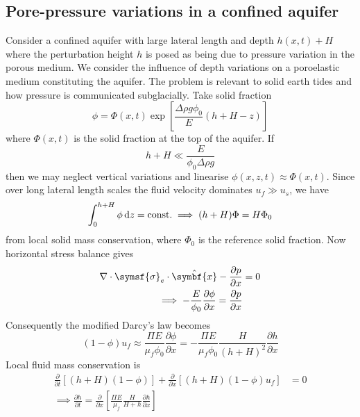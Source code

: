 \documentclass{jknotes}
\begin{document}
\subsection{Pore-pressure variations in a confined aquifer}
Consider a confined aquifer with large lateral length and depth $h(x,t) + H$
where the perturbation height $h$ is posed as being due to pressure variation
in the porous medium.  We consider the influence of depth variations on a
poroelastic medium constituting the aquifer. The problem is relevant to solid
earth tides and how pressure is communicated subglacially. Take solid fraction
\begin{equation}
	\phi = \Phi(x,t) \exp \left[ \frac{\Delta \rho g \phi_0}{E} (h+H-z)\right]
\end{equation}
where $\Phi(x,t)$ is the solid fraction at the top of the aquifer. If
\begin{equation}
	h + H \ll \frac{E}{\phi_0 \Delta \rho g}
\end{equation}
then we may neglect vertical variations and linearise $\phi(x,z,t) \approx
\Phi(x,t)$. Since over long lateral length scales the fluid velocity
dominates $u_f \gg u_s$, we have
\begin{equation}
	\int_0^{h+H} \phi \, \diffd z = \text{const.} \implies (h+H)\Phi = H\Phi_0
\end{equation}
from local solid mass conservation, where $\Phi_0$ is the reference solid
fraction. Now horizontal stress balance gives
\begin{align}
	\nabla \cdot \symsf{\sigma}_e \cdot \hat{\symbf{x}} - \frac{\partial
	p}{\partial x} &= 0 \\
	\implies -\frac{E}{\phi_0}\frac{\partial \phi}{\partial x} = \frac{\partial
	p}{\partial x}
\end{align}
Consequently the modified Darcy's law becomes
\begin{equation}
	(1-\phi)u_f \approx \frac{\Pi E}{\mu_f \phi_0} \frac{\partial
	\phi}{\partial x} = -\frac{\Pi E}{\mu_f \phi_0} \frac{H}{(h+H)^2}
	\frac{\partial h}{\partial x}
\end{equation}
Local fluid mass conservation is
\begin{align}
	\frac{\partial}{\partial t} \left[(h+H)(1-\phi)\right] +
	\frac{\partial}{\partial x} \left[ (h+H)(1-\phi)u_f\right] &= 0 \\
	\implies \frac{\partial h}{\partial t} = \frac{\partial}{\partial x}
	\left[\frac{\Pi E}{\mu_f} \frac{H}{H+h}\frac{\partial h}{\partial x}
	\right]
\end{align}
\end{document}
